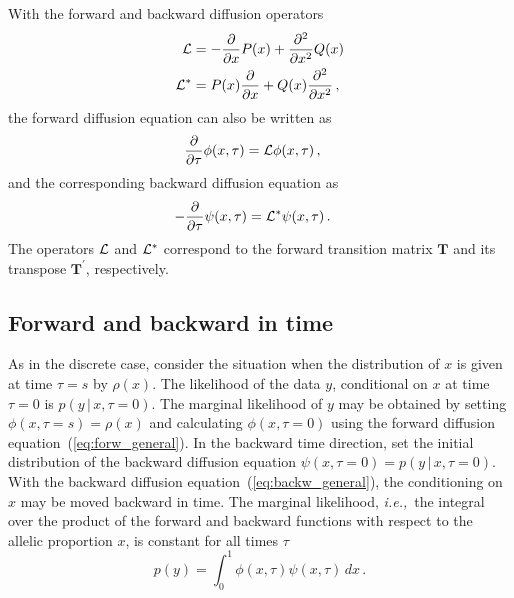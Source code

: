 \documentclass[preprint]{elsarticle}
\newcommand\given{{\,|\,}}
\newcommand\ie{{\it i.e.,}}
\newcommand\s{\ensuremath{s}}
\begin{document}
With the forward and backward diffusion operators 
\begin{equation}
 \begin{split}
     {\cal L}&=-\frac{\partial}{\partial x}P(x)+ \frac{\partial^2}{\partial x^2}Q(x)\\
     {\cal L}^{*}&=P(x)\frac{\partial}{\partial x} +Q(x)\frac{\partial^2}{\partial x^2}\,,
 \end{split}
\end{equation}
the forward diffusion equation can also be written as
\begin{equation}\label{eq:forw_general}
\begin{split}
\frac{\partial}{\partial \tau}\phi(x,\tau)&={\cal L} \phi(x, \tau)\,,
\end{split}
\end{equation}
and the corresponding backward diffusion equation as
\begin{equation}\label{eq:backw_general}
\begin{split}
-\frac{\partial}{\partial \tau}\psi(x,\tau)&={\cal L}^{*} \psi(x, \tau)\,.
\end{split}
\end{equation}
The operators ${\cal L}$ and ${\cal L}^{*}$ correspond to the forward transition matrix $\mathbf{T}$ and its transpose $\mathbf{T}^{'}$, respectively.

\subsection{Forward and backward in time}

As in the discrete case, consider the situation when the distribution of $x$ is given at time $\tau=\s$ by $\rho(x)$. The likelihood of the data $y$, conditional on $x$ at time $\tau=0$ is $p(y\given x,\tau=0)$. The marginal likelihood of $y$ may be obtained by setting $\phi(x,\tau=\s)=\rho(x)$ and calculating $\phi(x,\tau=0)$ using the forward diffusion equation~(\ref{eq:forw_general}). In the backward time direction, set the initial distribution of the backward diffusion equation  $\psi(x,\tau=0)=p(y\given x,\tau=0)$. With the backward diffusion equation~(\ref{eq:backw_general}), the conditioning on $x$ may be moved backward in time. The marginal likelihood, \ie\ the integral over the product of the forward and backward functions with respect to the allelic proportion $x$, is constant for all times $\tau$ 
\begin{equation}\label{eq:marg_like}
p(y) = \int_{0}^{1} \phi(x,\tau)\psi(x,\tau)  \,dx\,.
\end{equation}
\end{document}
